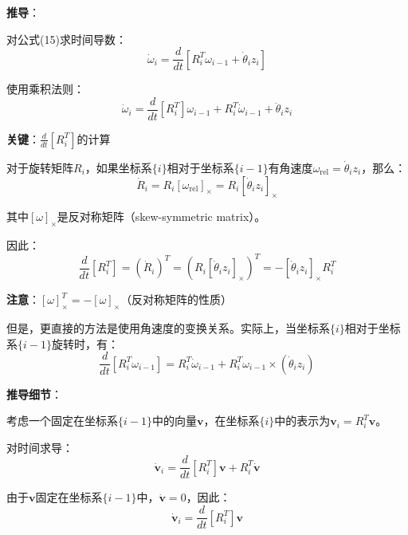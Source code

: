 \documentclass[12pt,a4paper]{article}
\begin{document}
\textbf{推导}：

对公式(15)求时间导数：
\begin{equation}
\dot{\omega}_i = \frac{d}{dt}[R_i^T \omega_{i-1} + \dot{\theta}_i z_i]
\end{equation}

使用乘积法则：
\begin{equation}
\dot{\omega}_i = \frac{d}{dt}[R_i^T] \omega_{i-1} + R_i^T \dot{\omega}_{i-1} + \ddot{\theta}_i z_i
\end{equation}

\textbf{关键}：$\frac{d}{dt}[R_i^T]$的计算

对于旋转矩阵$R_i$，如果坐标系$\{i\}$相对于坐标系$\{i-1\}$有角速度$\omega_{\text{rel}} = \dot{\theta}_i z_i$，那么：
\begin{equation}
\dot{R}_i = R_i [\omega_{\text{rel}}]_{\times} = R_i [\dot{\theta}_i z_i]_{\times}
\end{equation}

其中$[\omega]_{\times}$是反对称矩阵（skew-symmetric matrix）。

因此：
\begin{equation}
\frac{d}{dt}[R_i^T] = (\dot{R}_i)^T = (R_i [\dot{\theta}_i z_i]_{\times})^T = -[\dot{\theta}_i z_i]_{\times} R_i^T
\end{equation}

\textbf{注意}：$[\omega]_{\times}^T = -[\omega]_{\times}$（反对称矩阵的性质）

但是，更直接的方法是使用角速度的变换关系。实际上，当坐标系$\{i\}$相对于坐标系$\{i-1\}$旋转时，有：
\begin{equation}
\frac{d}{dt}[R_i^T \omega_{i-1}] = R_i^T \dot{\omega}_{i-1} + R_i^T \omega_{i-1} \times (\dot{\theta}_i z_i)
\end{equation}

\textbf{推导细节}：

考虑一个固定在坐标系$\{i-1\}$中的向量$\mathbf{v}$，在坐标系$\{i\}$中的表示为$\mathbf{v}_i = R_i^T \mathbf{v}$。

对时间求导：
\begin{equation}
\dot{\mathbf{v}}_i = \frac{d}{dt}[R_i^T] \mathbf{v} + R_i^T \dot{\mathbf{v}}
\end{equation}

由于$\mathbf{v}$固定在坐标系$\{i-1\}$中，$\dot{\mathbf{v}} = 0$，因此：
\begin{equation}
\dot{\mathbf{v}}_i = \frac{d}{dt}[R_i^T] \mathbf{v}
\end{equation}
\end{document}
